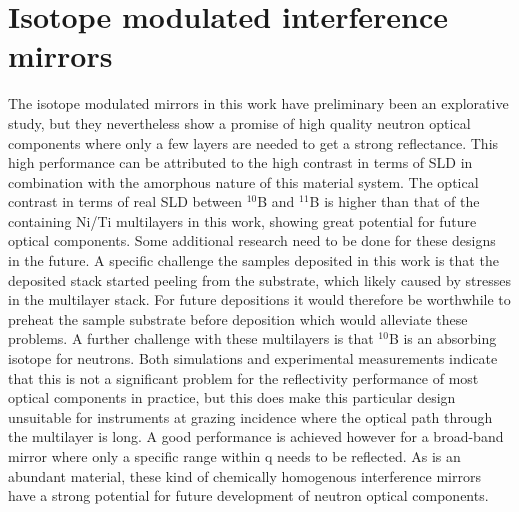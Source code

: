 \section{Isotope modulated interference mirrors}
The isotope modulated \BC mirrors in this work have preliminary been an explorative study, but they nevertheless show a promise of high quality neutron optical components where only a few layers are needed to get a strong reflectance. This high performance can be attributed to the high contrast in terms of SLD in combination with the amorphous nature of this material system. The optical contrast in terms of real SLD between  $^\textrm{10}$B and  $^\textrm{11}$B is higher than that of the \BC containing Ni/Ti multilayers in this work, showing great potential for future optical components. Some additional research need to be done for these designs in the future. A specific challenge the samples deposited in this work is that the deposited stack started peeling from the substrate, which likely caused by stresses in the multilayer stack. For future depositions it would therefore be worthwhile to preheat the sample substrate before deposition which would alleviate these problems. A further challenge with these multilayers is that $^\textrm{10}$B is an absorbing isotope for neutrons. Both simulations and experimental measurements indicate that this is not a significant problem for the reflectivity performance of most optical components in practice, but this does make this particular design unsuitable for instruments at grazing incidence where the optical path through the multilayer is long. A good performance is achieved however for a broad-band mirror where only a specific range within q needs to be reflected. As \natBC is an abundant material, these kind of chemically homogenous interference mirrors have a strong potential for future development of neutron optical components.